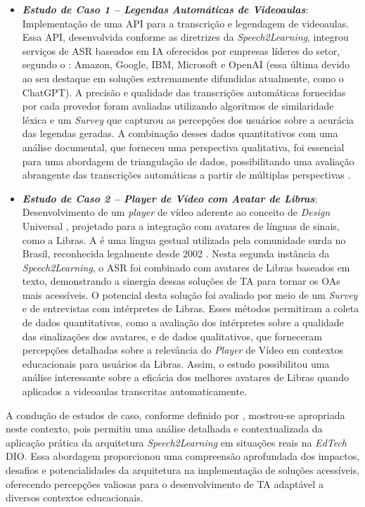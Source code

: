 \begin{itemize}
\item \textbf{\textit{Estudo de Caso 1 -- Legendas Automáticas de Videoaulas}}: Implementação de uma API para a transcrição e legendagem de videoaulas. Essa API, desenvolvida conforme as diretrizes da \textit{Speech2Learning}, integrou serviços de ASR baseados em IA oferecidos por empresas líderes do setor, segundo o : Amazon, Google, IBM, Microsoft e OpenAI (essa última devido ao seu destaque em soluções extremamente difundidas atualmente, como o ChatGPT). A precisão e qualidade das transcrições automáticas fornecidas por cada provedor foram avaliadas utilizando algoritmos de similaridade léxica e um \textit{Survey} que capturou as percepções dos usuários sobre a acurácia das legendas geradas. A combinação desses dados quantitativos com uma análise documental, que forneceu uma perspectiva qualitativa, foi essencial para uma abordagem de triangulação de dados, possibilitando uma avaliação abrangente das transcrições automáticas a partir de múltiplas perspectivas \cite{FalvoJr2023_HICSS, FalvoJr2024_FIE}.

\item \textbf{\textit{Estudo de Caso 2 -- Player de Vídeo com Avatar de Libras}}: Desenvolvimento de um \textit{player} de vídeo aderente ao conceito de \textit{Design} Universal \cite{GovBr2023}, projetado para a integração com avatares de línguas de sinais, como a Libras. A  é uma língua gestual utilizada pela comunidade surda no Brasil, reconhecida legalmente desde 2002 \cite{Quadros2017, Quadros2019, Honora2021}. Nesta segunda instância da \textit{Speech2Learning}, o ASR foi combinado com avatares de Libras baseados em texto, demonstrando a sinergia dessas soluções de TA para tornar os OAs mais acessíveis. O potencial desta solução foi avaliado por meio de um \textit{Survey} e de entrevistas com intérpretes de Libras. Esses métodos permitiram a coleta de dados quantitativos, como a avaliação dos intérpretes sobre a qualidade das sinalizações dos avatares, e de dados qualitativos, que forneceram percepções detalhadas sobre a relevância do \textit{Player} de Vídeo em contextos educacionais para usuários da Libras. Assim, o estudo possibilitou uma análise interessante sobre a eficácia dos melhores avatares de Libras quando aplicados a videoaulas transcritas automaticamente.
\end{itemize}

A condução de estudos de caso, conforme definido por , mostrou-se apropriada neste contexto, pois permitiu uma análise detalhada e contextualizada da aplicação prática da arquitetura \textit{Speech2Learning} em situações reais na \textit{EdTech} DIO. Essa abordagem proporcionou uma compreensão aprofundada dos impactos, desafios e potencialidades da arquitetura na implementação de soluções acessíveis, oferecendo percepções valiosas para o desenvolvimento de TA adaptável a diversos contextos educacionais.

